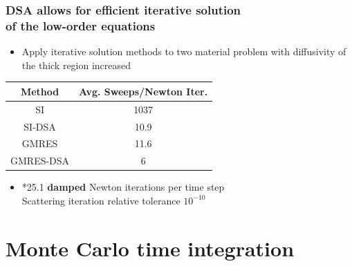 \documentclass[xcolor=dvipsnames,hyperref={pdfpagelabels=false},unknownkeysallowed]{beamer}
\newcommand{\colb}[1]{{\color{blue} #1}}
\newcommand{\colG}[1]{{\color{Gray!110} #1}}
\newcommand{\colr}[1]{{\color{red} #1}}
\newlength{\wideitemsep}
\let\olditem\item
\renewcommand{\item}{\setlength{\itemsep}{\wideitemsep}\olditem}
\begin{document}
\begin{frame}
\end{frame}




\begin{frame}
    \frametitle{DSA allows for efficient iterative solution \\  of the low-order equations}
    \begin{itemize}
        \item[] Apply iterative solution methods to two material problem
            with diffusivity of the thick region increased
    \end{itemize}
\begin{table}[p]
    \centering
    \begin{tabular}{c|c} \hline
        Method & Avg. Sweeps/Newton Iter. \\ \hline
        SI        & \colr{1037}      \\
        SI-DSA    & \colb{10.9}        \\
        GMRES     & 11.6        \\
        GMRES-DSA & \colb{6}      \\ \hline
    \end{tabular}
\end{table}
\begin{itemize}
    \item[]\colG{*25.1 \textbf{damped} Newton iterations per time step \\ Scattering iteration relative tolerance $10^{-10}$}
    \end{itemize}
\end{frame}

\section{Monte Carlo time integration}
\end{document}
